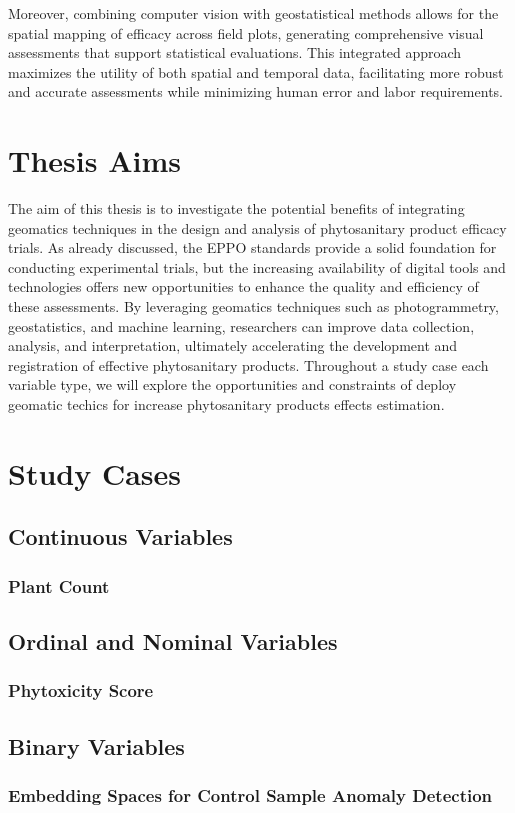\documentclass[12pt,a4paper,oneside]{report}
\begin{document}
Moreover, combining computer vision with geostatistical methods allows for the spatial mapping 
of efficacy across field plots, generating comprehensive visual assessments that support 
statistical evaluations. This integrated approach maximizes the utility of both spatial 
and temporal data, facilitating more robust and accurate assessments while minimizing human 
error and labor requirements.

\chapter{Thesis Aims}

The aim of this thesis is to investigate the potential benefits of integrating
geomatics techniques in the design and analysis of phytosanitary product efficacy trials.
As already discussed, the EPPO standards provide a solid foundation for conducting experimental trials,
but the increasing availability of digital tools and technologies offers new opportunities to enhance
the quality and efficiency of these assessments. By leveraging geomatics techniques such as photogrammetry,
geostatistics, and machine learning, researchers can improve data collection, analysis, and interpretation,
ultimately accelerating the development and registration of effective phytosanitary products.
Throughout a study case each variable type, we will explore the opportunities and
constraints of deploy geomatic techics for increase phytosanitary products effects
estimation.

\chapter{Study Cases}
\section{Continuous Variables}
\subsection{Plant Count}

\section{Ordinal and Nominal Variables}
\subsection{Phytoxicity Score}

\section{Binary Variables}
\subsection{Embedding Spaces for Control Sample Anomaly Detection}



\end{document}
